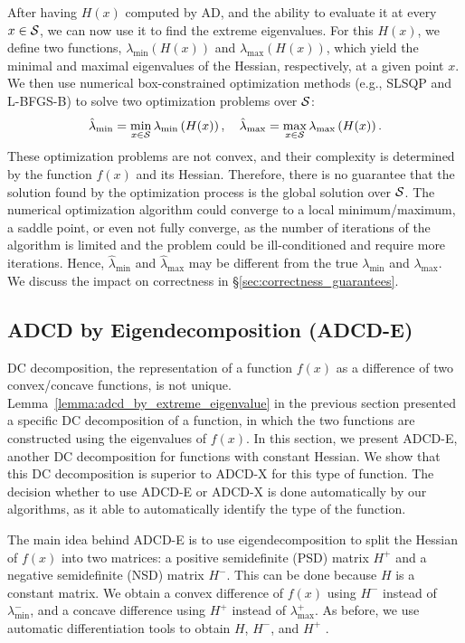After having $H(x)$ computed by AD, and the ability to evaluate it at every $x \in \mathcal{S}$, we can now use it to find the extreme eigenvalues.
For this $H(x)$, we define two functions, $\lambda_{\min} \left( H(x) \right)$ and $\lambda_{\max} \left( H(x) \right)$, which yield the minimal and maximal eigenvalues of the Hessian, respectively, at a given point $x$.
We then use numerical box-constrained optimization methods (e.g., SLSQP and L-BFGS-B) to solve two optimization problems over $\mathcal{S}$:
\begin{align} \label{eq:numerical_eigenvalues}
\hat{\lambda}_{\min} = \min_{x \in \mathcal{S}} \lambda_{\min} \left( H(x) \right),\quad
\hat{\lambda}_{\max} = \max_{x \in \mathcal{S}} \lambda_{\max} \left( H(x) \right).
\end{align}
These optimization problems are not convex, and their complexity is determined by the function $f(x)$ and its Hessian.
Therefore, there is no guarantee that the solution found by the optimization process is the global solution over $\mathcal{S}$.
The numerical optimization algorithm could converge to a local minimum/maximum, a saddle point, or even not fully converge, as the number of iterations of the algorithm is limited and the problem could be ill-conditioned and require more iterations.
Hence, $\hat{\lambda}_{\min}$ and $\hat{\lambda}_{\max}$ may be different from the true $\lambda_{\min}$ and $\lambda_{\max}$.
We discuss the impact on correctness in \S\ref{sec:correctness_guarantees}.




\subsection{ADCD by Eigendecomposition (ADCD-E)} 
\label{sec:adcd_by_eigendecomposition}


DC decomposition, the representation of a function $f(x)$ as a difference of two convex/concave functions, is not unique.
Lemma~\ref{lemma:adcd_by_extreme_eigenvalue} in the previous section presented a specific DC decomposition of a function, in which the two functions are constructed using the eigenvalues of $f(x)$.
In this section, we present ADCD-E, another DC decomposition for functions with constant Hessian.
We show that this DC decomposition is superior to ADCD-X for this type of function.
The decision whether to use ADCD-E or ADCD-X is done automatically by our algorithms, as it able to automatically identify the type of the function.

The main idea behind ADCD-E is to use eigendecomposition to split the Hessian of $f(x)$ into two matrices: a positive semidefinite (PSD) matrix $H^+$ and a negative semidefinite (NSD) matrix $H^-$.
This can be done because $H$ is a constant matrix.
We obtain a convex difference of $f(x)$ using $H^-$ instead of $\lambda^{-}_{\min}$, and a concave difference using $H^+$ instead of $\lambda^{+}_{\max}$.
As before, we use automatic differentiation tools to obtain $H$, $H^-$, and $H^+$ .


